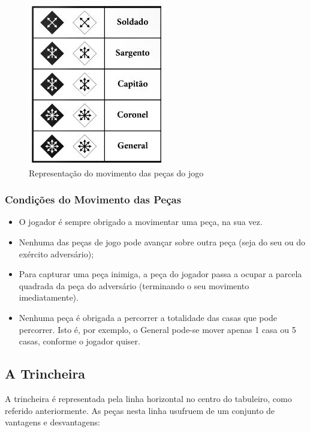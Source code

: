 \documentclass[a4paper]{article}
\begin{document}
\begin{figure}[h!]
\begin{center}
\includegraphics[scale=0.5]{img/pieces-movement.jpg}
\caption{Representação do movimento das peças do jogo}
\label{fig:5}
\end{center}
\end{figure}

\subsubsection{Condições do Movimento das Peças}

\begin{itemize}
	\item O jogador é sempre obrigado a movimentar uma peça, na sua vez.
	\item Nenhuma das peças de jogo pode avançar sobre outra peça (seja do seu ou do exército adversário);
	\item Para capturar uma peça inimiga, a peça do jogador passa a ocupar a parcela quadrada da peça do adversário (terminando o seu movimento imediatamente).
	\item Nenhuma peça é obrigada a percorrer a totalidade das casas que pode percorrer. Isto é, por exemplo, o General pode-se mover apenas 1 casa ou 5 casas, conforme o jogador quiser.
\end{itemize}

\newpage

\subsection{A Trincheira}

A trincheira é representada pela linha horizontal no centro do tabuleiro, como referido anteriormente. As peças nesta linha usufruem de um conjunto de vantagens e desvantagens: 
\end{document}
